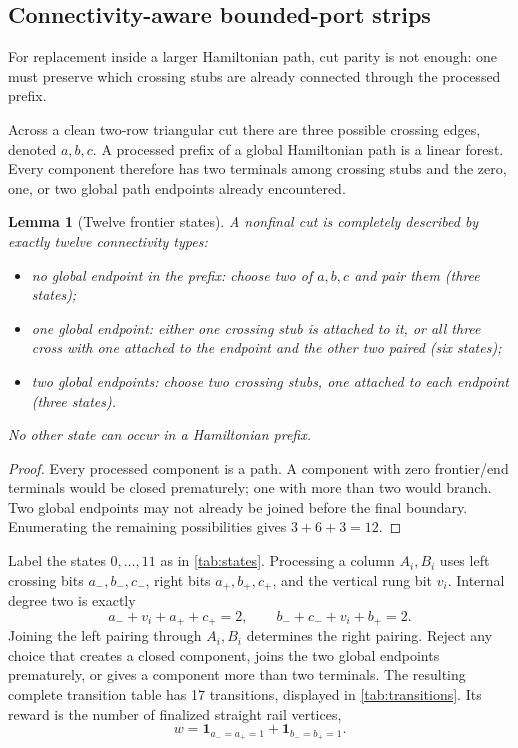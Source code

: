 \documentclass[11pt]{article}
\newtheorem{lemma}[theorem]{Lemma}
\theoremstyle{definition}
\begin{document}
\subsection{Connectivity-aware bounded-port strips}
For replacement inside a larger Hamiltonian path, cut parity is not enough: one must preserve which crossing stubs are already connected through the processed prefix.

Across a clean two-row triangular cut there are three possible crossing edges, denoted $a,b,c$.  A processed prefix of a global Hamiltonian path is a linear forest.  Every component therefore has two terminals among crossing stubs and the zero, one, or two global path endpoints already encountered.

\begin{lemma}[Twelve frontier states]\label{lem:12states}
A nonfinal cut is completely described by exactly twelve connectivity types:
\begin{itemize}
\item no global endpoint in the prefix: choose two of $a,b,c$ and pair them (three states);
\item one global endpoint: either one crossing stub is attached to it, or all three cross with one attached to the endpoint and the other two paired (six states);
\item two global endpoints: choose two crossing stubs, one attached to each endpoint (three states).
\end{itemize}
No other state can occur in a Hamiltonian prefix.
\end{lemma}
\begin{proof}
Every processed component is a path.  A component with zero frontier/end terminals would be closed prematurely; one with more than two would branch.  Two global endpoints may not already be joined before the final boundary.  Enumerating the remaining possibilities gives $3+6+3=12$.
\end{proof}

Label the states $0,\ldots,11$ as in \cref{tab:states}.  Processing a column $A_i,B_i$ uses left crossing bits $a_-,b_-,c_-$, right bits $a_+,b_+,c_+$, and the vertical rung bit $v_i$.  Internal degree two is exactly
\[
a_-+v_i+a_++c_+=2,
\qquad
b_-+c_-+v_i+b_+=2.
\]
Joining the left pairing through $A_i,B_i$ determines the right pairing.  Reject any choice that creates a closed component, joins the two global endpoints prematurely, or gives a component more than two terminals.  The resulting complete transition table has 17 transitions, displayed in \cref{tab:transitions}.  Its reward is the number of finalized straight rail vertices,
\[
w=\mathbf1_{a_-=a_+=1}+\mathbf1_{b_-=b_+=1}.
\]
\end{document}

